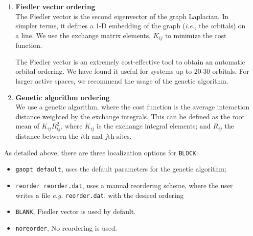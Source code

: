 \documentclass[letterpaper,12pt,aps, pra]{revtex4-1}
\begin{document}
\begin{enumerate}
	\item \textbf{Fiedler vector ordering}\\
The Fiedler vector is the second eigenvector of the graph Laplacian. In
simpler terms, it defines a 1-D embedding of the graph (\textit{i.e.}, the
orbitals) on a line. We use the exchange matrix elements, $K_{ij}$ to minimize
the cost function.

The Fiedler vector is an extremely cost-effective tool to obtain an automatic
orbital ordering. We have found it useful for systems up to 20-30 orbitals.
For larger active spaces, we recommend the usage of the genetic algorithm.

\item \textbf{Genetic algorithm ordering} \\
We use a genetic algorithm, where the cost function is the average interaction
distance weighted by the exchange integrals. This can be defined as the root
mean of $K_{ij}R_{ij}^{2}$, where $K_{ij}$ is the exchange integral elements;
and $R_{ij}$ the distance between the $i$th and $j$th sites.
\end{enumerate}

As detailed above, there are three localization options for \texttt{BLOCK}:

\begin{itemize}
	\item \texttt{gaopt default}, uses the default parameters for the genetic
		algorithm;
	\item \texttt{reorder reorder.dat}, uses a manual reordering scheme,
		where the user writes a file \textit{e.g.} \texttt{reorder.dat}, 
		with the desired ordering
	\item \texttt{BLANK}, Fiedler vector is used by default.
   \item \texttt{noreorder}, No reordering is used.

\end{itemize}
 
\end{document}
